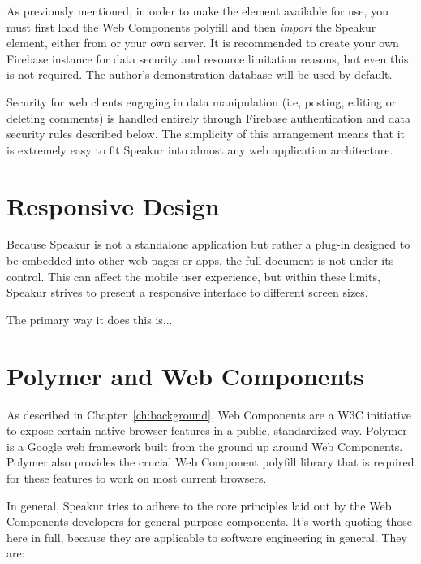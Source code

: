 As previously mentioned, in order to make the 
 element available for use, you must first load the Web Components polyfill and then \textit{import} the Speakur element, either from  or your own server.
It is recommended to create your own Firebase instance for data security and resource limitation reasons, but even this is not required. 
The author's demonstration database will be used by default.

Security for web clients engaging in data manipulation (i.e, posting, editing or deleting comments) is handled entirely through Firebase authentication and data security rules described below.
The simplicity of this arrangement means that it is extremely easy to fit Speakur into almost any web application architecture.

\section{Responsive Design}
Because Speakur is not a standalone application but rather a plug-in designed to be embedded into other web pages or apps, 
the full document is not under its control.
This can affect the mobile user experience,
but within these limits, Speakur strives to present a responsive interface to different screen sizes.

The primary way it does this is...

\section{Polymer and Web Components}
As described in Chapter~\ref{ch:background}, 
Web Components are a 
W3C initiative 
to expose certain native browser features in a public, standardized way. 
Polymer is a 
Google 
web framework built from the ground up around Web Components.
Polymer also provides the crucial Web Component 
polyfill library 
that is required for these features to work on most current browsers.

In general, Speakur tries to adhere to the core principles laid out by the 
Web Components developers 
for general purpose components. 
It's worth quoting those here in full, 
because they are applicable to software engineering in general. They are:

